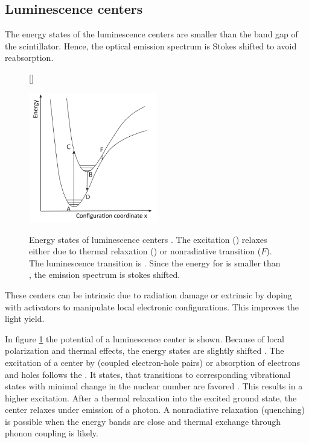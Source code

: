\subsection{Luminescence centers}
The energy states of the luminescence centers are smaller than the band gap of the scintillator. Hence, the optical emission spectrum is Stokes shifted to avoid reabsorption. \par 
\begin{figure}[t]
	[\FBwidth]
	{\caption[Luminescence center]{Energy states of luminescence centers \cite{wermes}. The excitation () relaxes either due to thermal relaxation () or nonradiative transition ($F$). The luminescence transition is . Since the energy for  is smaller than , the emission spectrum is stokes shifted.}   
		\label{fig:ch2:luminescence}}
	{\includegraphics[width=0.5\textwidth]{./graphics/ch2/lum_center.png}}
\end{figure}
These centers can be intrinsic due to radiation damage or extrinsic by doping with activators to manipulate local electronic configurations. This improves the light yield.\par 
In figure \ref{fig:ch2:luminescence} the potential of a luminescence center is shown. Because of local polarization and thermal effects, the energy states are slightly shifted \cite{wermes}. The excitation of a center by  (coupled electron-hole pairs) or absorption of electrons and holes follows the . It states, that transitions to corresponding vibrational states with minimal change in the nuclear number are favored \cite{franck}. This results in a higher excitation. After a thermal relaxation into the excited ground state, the center relaxes under emission of a photon. A nonradiative relaxation (quenching) is possible when the energy bands are close and thermal exchange through phonon coupling is likely. 
